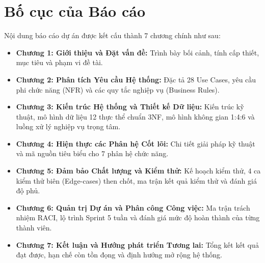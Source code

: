 \section{Bố cục của Báo cáo}
Nội dung báo cáo dự án được kết cấu thành 7 chương chính như sau:
\begin{itemize}
    \item \textbf{Chương 1: Giới thiệu và Đặt vấn đề:} Trình bày bối cảnh, tính cấp thiết, mục tiêu và phạm vi đề tài.
    \item \textbf{Chương 2: Phân tích Yêu cầu Hệ thống:} Đặc tả 28 Use Cases, yêu cầu phi chức năng (NFR) và các quy tắc nghiệp vụ (Business Rules).
    \item \textbf{Chương 3: Kiến trúc Hệ thống và Thiết kế Dữ liệu:} Kiến trúc kỹ thuật, mô hình dữ liệu 12 thực thể chuẩn 3NF, mô hình không gian 1:4:6 và luồng xử lý nghiệp vụ trọng tâm.
    \item \textbf{Chương 4: Hiện thực các Phân hệ Cốt lõi:} Chi tiết giải pháp kỹ thuật và mã nguồn tiêu biểu cho 7 phân hệ chức năng.
    \item \textbf{Chương 5: Đảm bảo Chất lượng và Kiểm thử:} Kế hoạch kiểm thử, 4 ca kiểm thử biên (Edge-cases) then chốt, ma trận kết quả kiểm thử và đánh giá độ phủ.
    \item \textbf{Chương 6: Quản trị Dự án và Phân công Công việc:} Ma trận trách nhiệm RACI, lộ trình Sprint 5 tuần và đánh giá mức độ hoàn thành của từng thành viên.
    \item \textbf{Chương 7: Kết luận và Hướng phát triển Tương lai:} Tổng kết kết quả đạt được, hạn chế còn tồn đọng và định hướng mở rộng hệ thống.
\end{itemize}

